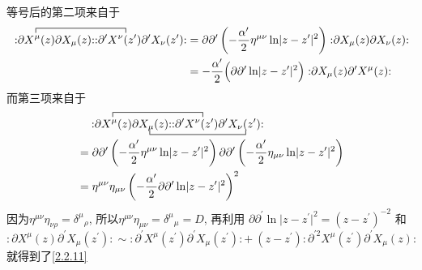 \begin{tcolorbox}
	\begin{remark}
		等号后的第二项来自于
	\begin{align*}
	\contraction{: \partial}{X^{\mu}}{(z) \partial X_{\mu}(z):: \partial^{\prime}}{X^{\nu}}: \mathrel{\partial  X^{\mu}(z) \partial X_{\mu}(z)}:
	: \mathrel{\partial^{\prime} X^{\nu} (z^{\prime}) \partial^{\prime} X_{\nu}(z^{\prime})}:  
	&=\partial \partial^{\prime}\left(-\frac{\alpha^{\prime}}{2} \eta^{\mu \nu}\ln \lvert z-z^{\prime}\rvert^{2}\right) 
	: \mathrel{\partial X_{\mu}(z) \partial X_{\nu}(z)}: \\
	&=-\frac{\alpha^{\prime}}{2} \Bigl(\partial \partial^{\prime} \ln \lvert z-z^{\prime}\rvert^{2}\Bigr)  
	: \mathrel{\partial X_{\mu}(z) \partial^{\prime} X^{\mu}(z)}:
	\end{align*}
	而第三项来自于
	\begin{align*}
	&\quad \contraction{: \partial}{X^{\mu}}{(z) \partial X_{\mu}(z):: \partial^{\prime}}{X^{\nu}}
	\bcontraction{: \partial X^\mu(z) \partial}{ X_\mu}{(z):: \partial^\prime X^\nu(z^\prime)\partial^\prime}{X_\nu}
		:\mathrel {\partial X^{\mu}(z) \partial X_{\mu}(z)}: : \mathrel{\partial^{\prime} X^{\nu}(z^{\prime}) \partial^{\prime} X_{\nu}(z^{\prime})}:\\
	&=\partial \partial^{\prime}\left(-\frac{\alpha^{\prime}}{2} \eta ^{\mu \nu} \ln \lvert z-z^{\prime}\rvert^{2}\right) 
	\partial \partial^{\prime}\left(-\frac{\alpha^{\prime}}{2} \eta_{\mu \nu}\ln \lvert z-z^{\prime}\rvert^{2}\right) \\
	&=\eta^{\mu \nu} \eta_{\mu \nu}\left(-\frac{\alpha^{\prime}}{2} \partial \partial^{\prime}\ln \lvert z- z^{\prime}\rvert ^{2}\right)^{2}
	\end{align*}
	因为$\eta^{\mu \nu} \eta_{\nu\rho}=\delta^{\mu}{}_{\rho}$, 所以$\eta^{\mu \nu} \eta_{\mu \nu}=\delta^{\mu}{ }_{\mu}=D$, 再利用
	$
	\partial \partial^{\prime} \ln \lvert z-z^{\prime }\vert ^{2}= (z-z^{\prime})^{-2}
	$
	和
	\[
	:\mathrel{\partial X^\mu(z)\partial^\prime X_{\mu}(z^\prime)}:\sim :\mathrel{\partial^\prime X^\mu(z^\prime)\partial^\prime X_\mu(z^\prime)}: 
	+ \:(z-z^\prime):\mathrel{\partial^{\prime 2} X^\mu(z^\prime)\partial^\prime X_\mu(z)}:
	\]
	就得到了\eqref{2.2.11}
	\end{remark}
\end{tcolorbox}


